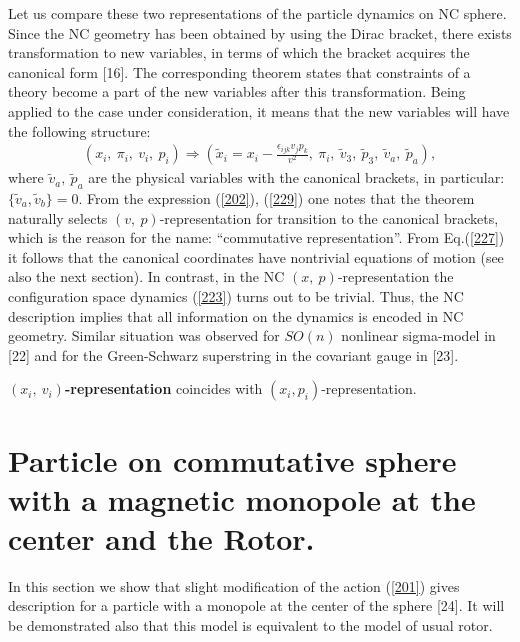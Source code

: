 \documentclass[paper a4]{article}
\begin{document}
Let us compare these two representations of the particle dynamics on
NC sphere. Since the NC geometry has been obtained by using the
Dirac bracket, there exists transformation to new variables,
in terms of which the bracket acquires the canonical form [16].
The corresponding theorem
states that constraints of a theory become a part of the new variables
after this transformation. Being applied to the case under consideration,
it means that the new variables will have the following structure:
\begin{eqnarray}\label{229}
(x_i, ~ \pi_i, ~ v_i, ~ p_i) \Longrightarrow (\tilde x_i=x_i-
\frac{\epsilon_{ijk}v_jp_k}{v^2}, ~ \pi_i, ~ \tilde v_3, ~ \tilde p_3,
~ \tilde v_a, ~ \tilde p_a),
\end{eqnarray}
where $\tilde v_a, ~ \tilde p_a$ are the
physical variables with the canonical brackets, in particular:
$\{\tilde v_a, \tilde v_b\}=0$.  From the expression
(\ref{202}), (\ref{229}) one
notes that the theorem naturally selects $(v,~ p)$-representation for
transition to the canonical brackets, which is the reason for the name:
``commutative representation''. From Eq.(\ref{227}) it follows that
the canonical coordinates have nontrivial equations of motion
(see also the next section). In contrast, in the NC
$(x, ~ p)$-representation the configuration space dynamics (\ref{223})
turns out to be trivial. Thus, the NC description
implies that all information on the dynamics is encoded in
NC geometry. Similar situation was observed for
$SO(n)$ nonlinear sigma-model in [22] and for the Green-Schwarz
superstring in the covariant gauge in [23].

{\bf $(x_i, ~ v_i)$-representation} coincides with
$(x_i, p_i)$-representation.

\section{Particle on commutative sphere with a magnetic monopole at the
center and the Rotor.}
In this section we show that slight modification of the action
(\ref{201}) gives description for a particle with a monopole at the
center of the sphere [24]. It will be demonstrated also that
this model is equivalent to the model of usual rotor.
\end{document}
